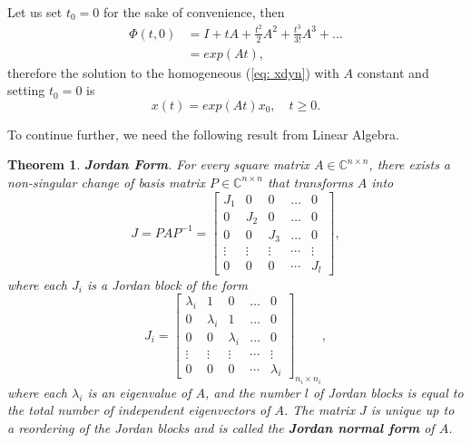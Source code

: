 \documentclass[11pt,a4paper,titlepage]{article}
\newtheorem{theorem}{Theorem}
\begin{document}
Let us set $t_0 = 0$ for the sake of convenience, then
\begin{align}
	\Phi(t,0) &= I + tA + \frac{t^2}{2} A^2 + \frac{t^3}{3!} A^3 + \dots \nonumber \\
	&= exp(At),
\end{align}
therefore the solution to the homogeneous (\ref{eq: xdyn}) with $A$ constant and setting $t_0 = 0$ is
\begin{equation}
	x(t) = exp(At)x_0,\quad t\geq 0.
	\label{eq: xexp}
\end{equation}

To continue further, we need the following result from Linear Algebra.
\begin{theorem}
\textbf{Jordan Form}. For every square matrix $A\in\mathbb{C}^{n \times n}$, there exists a non-singular change of basis matrix $P\in\mathbb{C}^{n \times n}$ that transforms $A$ into
\begin{equation}
	J = PAP^{-1} = \begin{bmatrix}
		J_1 & 0 & 0 & \dots & 0 \\
		0 & J_2 & 0 & \dots & 0 \\
		0 & 0 & J_3 & \dots & 0 \\
		\vdots & \vdots & \vdots & \cdots & \vdots \\
		0 & 0 & 0 & \cdots & J_l
	\end{bmatrix},
\end{equation}
where each $J_i$ is a Jordan block of the form
	\begin{equation}
	J_i = \begin{bmatrix}
\lambda_i & 1 & 0 & \dots & 0 \\
		0 & \lambda_i & 1 & \dots & 0 \\
		0 & 0 & \lambda_i & \dots & 0 \\
		\vdots & \vdots & \vdots & \cdots & \vdots \\
		0 & 0 & 0 & \cdots & \lambda_i
	\end{bmatrix}_{n_i\times n_i},
	\end{equation}
	where each $\lambda_i$ is an eigenvalue of $A$, and the number $l$ of Jordan blocks is equal to the total number of independent eigenvectors of $A$. The matrix $J$ is unique up to a reordering of the Jordan blocks and is called the \textbf{Jordan normal form} of $A$.
\end{theorem}
\end{document}
